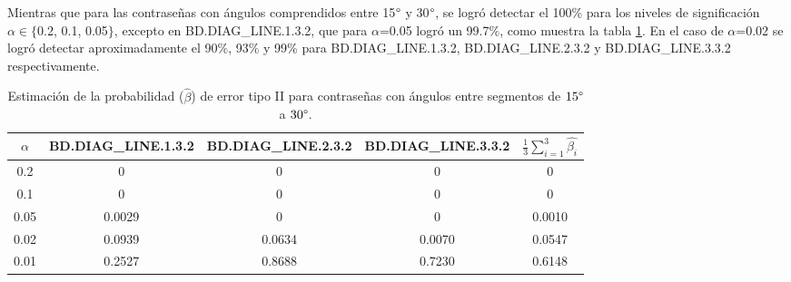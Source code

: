 \documentclass[12pt]{report}
\begin{document}


Mientras que para las contraseñas con ángulos comprendidos entre 15$\degree$ y 30$\degree$, se logró detectar el 100\% para los niveles de significación $\alpha \in \{$0.2, 0.1, 0.05$\}$, excepto en BD.DIAG\_LINE.1.3.2, que para $\alpha$=0.05 logró un 99.7\%, como muestra la tabla \ref{tab:error2-15-30}. En el caso de $\alpha$=0.02 se logró detectar aproximadamente el 90\%, 93\% y 99\% para BD.DIAG\_LINE.1.3.2, BD.DIAG\_LINE.2.3.2 y BD.DIAG\_LINE.3.3.2 respectivamente.

\begin{table}[h!]
	\centering
		\caption{Estimación de la probabilidad ($\hat{\beta}$) de error tipo II para contraseñas con ángulos entre segmentos de $15\degree$ a $30\degree$.}
	\begin{tabular}{|c|ccc|c|}
		\hline
		$\alpha$& BD.DIAG\_LINE.1.3.2 & BD.DIAG\_LINE.2.3.2 & BD.DIAG\_LINE.3.3.2 &$\frac{1}{3} \sum_{i=1}^{3} \hat{\beta_i}$ \\
		\hline
		0.2 & 0     	    & 0     		& 0     & 0    \\
		0.1 & 0			    & 0   	   	    & 0     &  0   \\
		0.05& 0.0029     	& 0     	 & 0     & 0.0010 \\
		0.02& 0.0939     	& 0.0634   	 & 0.0070 & 0.0547    \\
		0.01& 0.2527     	& 0.8688   & 0.7230 & 0.6148     \\
		\hline
	\end{tabular}

	\label{tab:error2-15-30}
\end{table}
\end{document}
